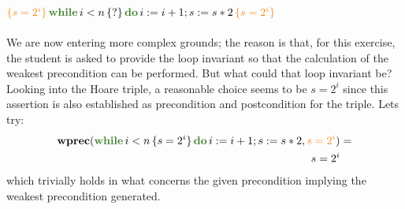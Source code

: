 \documentclass[11pt]{article}
\newcommand{\kw}[1]{{\color{OliveGreen}{#1}}}
\newcommand{\horange}[1]{{\color{BurntOrange}{#1}}}
\newcommand{\hoaret}[3]{{\color{BurntOrange}{\{#1\}}}\,#2\,{\color{BurntOrange}{\{#3\}}}}
\begin{document}
 $\hoaret{s = 2^i}{\textbf{\kw{while}}\,i<n\,\{?\}\,\textbf{\kw{do}}\,i := i +1 ;s := s*2}{s = 2^i}$\\\vspace{0.3cm}\\
We are now entering more complex grounds; the reason is that, for this exercise, the student is asked to provide the loop invariant so that the calculation of the weakest precondition can be performed. But what could that loop invariant be? Looking into the Hoare triple, a reasonable choice seems to be $s = 2^i$ since this assertion is also established as precondition and postcondition for the triple. Lets try:
\begin{align*}
  \textbf{wprec}(\textbf{\kw{while}}\,i<n\,\{s = 2^i\}\,\textbf{\kw{do}}\,i := i +1 ;s := s*2,\horange{s = 2^i}) & = \\s = 2^i
\end{align*}
which trivially holds in what concerns the given precondition implying the weakest precondition generated. \\\vspace{0.2cm}\\ 
\end{document}
